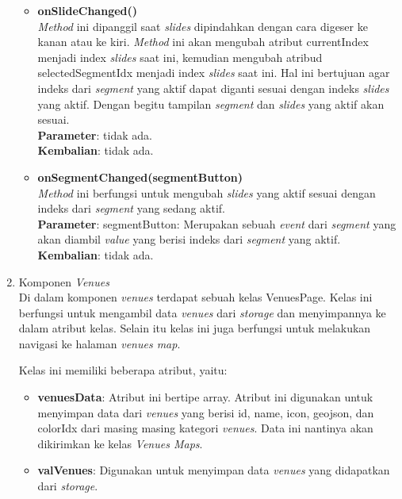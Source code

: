 \begin{enumerate}
\begin{itemize}
				\item \textbf{onSlideChanged()}\\
					\textit{Method} ini dipanggil saat \textit{slides} dipindahkan dengan cara digeser ke kanan atau ke kiri. \textit{Method} ini akan mengubah atribut currentIndex menjadi index \textit{slides} saat ini, kemudian mengubah atribud selectedSegmentIdx menjadi index \textit{slides} saat ini. Hal ini bertujuan agar indeks dari \textit{segment} yang aktif dapat diganti sesuai dengan indeks \textit{slides} yang aktif. Dengan begitu tampilan \textit{segment} dan \textit{slides} yang aktif akan sesuai. \\
					\textbf{Parameter}: tidak ada. \\
					\textbf{Kembalian}: tidak ada.
									
					
				\item \textbf{onSegmentChanged(segmentButton)}\\
					\textit{Method} ini berfungsi untuk mengubah \textit{slides} yang aktif sesuai dengan indeks dari \textit{segment} yang sedang aktif. \\
					\textbf{Parameter}: segmentButton: Merupakan sebuah \textit{event} dari \textit{segment} yang akan diambil \textit{value} yang berisi indeks dari \textit{segment} yang aktif. \\
					\textbf{Kembalian}: tidak ada.
			\end{itemize}
			
			\item Komponen \textit{Venues} \\
				Di dalam komponen \textit{venues} terdapat sebuah kelas VenuesPage. Kelas ini berfungsi untuk mengambil data \textit{venues} dari \textit{storage} dan menyimpannya ke dalam atribut kelas. Selain itu kelas ini juga berfungsi untuk melakukan navigasi ke halaman \textit{venues map}.
				
				Kelas ini memiliki beberapa atribut, yaitu:
				\begin{itemize}
					\item \textbf{venuesData}: Atribut ini bertipe array. Atribut ini digunakan untuk menyimpan data dari \textit{venues} yang berisi id, name, icon, geojson, dan colorIdx dari masing masing kategori \textit{venues}. Data ini nantinya akan dikirimkan ke kelas \textit{Venues Maps}.
					\item \textbf{valVenues}: Digunakan untuk menyimpan data \textit{venues} yang didapatkan dari \textit{storage}.
				\end{itemize}
				

\end{enumerate}
